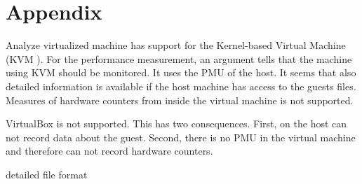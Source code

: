 \appendix
\section{Appendix}

\begin{frame}{Analyze virtualized machine}
 has support for the Kernel-based Virtual Machine (KVM \cite{kvm}). For the performance measurement, an argument tells  that the machine using KVM should be monitored. It uses the PMU of the host. It seems that also detailed information is available if the host machine has access to the guests  files. Measures of hardware counters from inside the virtual machine is not supported.

VirtualBox \cite{virtualbox} is not supported. This has two consequences. First,  on the host can not record data about the guest. Second, there is no PMU in the virtual machine and therefore  can not record hardware counters.
\end{frame}

\begin{frame}{detailed file format\label{sec:fileformat}}
\end{frame}

